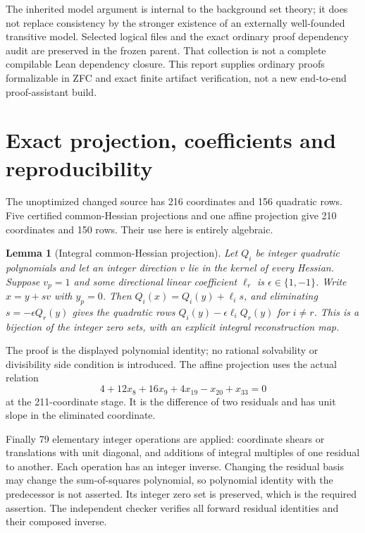 \documentclass[11pt,a4paper]{article}
\newtheorem{lemma}[theorem]{Lemma}
\theoremstyle{remark}\newtheorem{remark}[theorem]{Remark}
\begin{document}
The inherited model argument is internal to the background set theory; it
does not replace consistency by the stronger existence of an externally
well-founded transitive model. Selected logical files and the exact ordinary
proof dependency audit are preserved in the frozen parent. That collection
is not a complete compilable Lean dependency closure. This report supplies
ordinary proofs formalizable in ZFC and exact finite artifact verification,
not a new end-to-end proof-assistant build.

\section{Exact projection, coefficients and reproducibility}\label{sec:finite}

The unoptimized changed source has 216 coordinates and 156 quadratic rows.
Five certified common-Hessian projections and one affine projection give
210 coordinates and 150 rows. Their use here is entirely algebraic.

\begin{lemma}[Integral common-Hessian projection]
Let $Q_i$ be integer quadratic polynomials and let an integer direction $v$
lie in the kernel of every Hessian. Suppose $v_p=1$ and some directional
linear coefficient $\ell_r$ is $\epsilon\in\{1,-1\}$. Write
$x=y+sv$ with $y_p=0$. Then $Q_i(x)=Q_i(y)+\ell_i s$, and eliminating
$s=-\epsilon Q_r(y)$ gives the quadratic rows
$Q_i(y)-\epsilon\ell_iQ_r(y)$ for $i\ne r$. This is a bijection of the
integer zero sets, with an explicit integral reconstruction map.
\end{lemma}
The proof is the displayed polynomial identity; no rational solvability or
divisibility side condition is introduced. The affine projection uses the
actual relation
\[
4+12x_8+16x_9+4x_{19}-x_{20}+x_{33}=0
\]
at the 211-coordinate stage. It is the difference of two residuals and has
unit slope in the eliminated coordinate.

Finally 79 elementary integer operations are applied: coordinate shears or
translations with unit diagonal, and additions of integral multiples of
one residual to another. Each operation has an integer inverse. Changing
the residual basis may change the sum-of-squares polynomial, so polynomial
identity with the predecessor is not asserted. Its integer zero set is
preserved, which is the required assertion. The independent checker verifies
all forward residual identities and their composed inverse.
\end{document}
